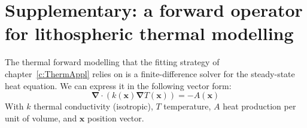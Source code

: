 \chapter{Supplementary: a forward operator for lithospheric thermal modelling}
\label{c:ThermModel}

The thermal forward modelling that the fitting strategy of chapter~\ref{c:ThermAppl} relies on is a finite-difference solver for the steady-state heat equation.
We can express it in the following vector form:
\begin{equation}
    \label{suppl:eq:heateq}
    \bm{\nabla} \cdot ( k(\bm{x}) \bm{\nabla} T(\bm{x}) ) = - A(\bm{x})
\end{equation}
With $k$ thermal conductivity (isotropic), $T$ temperature, $A$ heat production per unit of volume, and $\bm{x}$ position vector.
